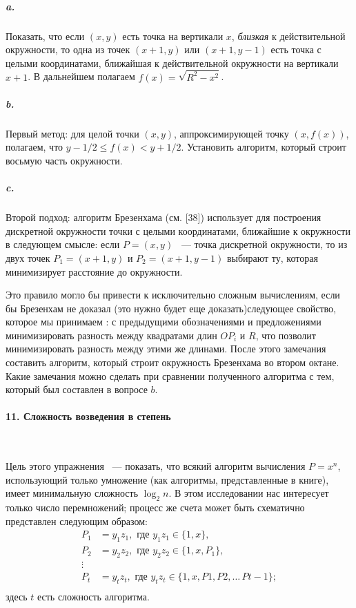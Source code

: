 \documentclass{mai_book}
\begin{document}
\subparagraph { a.} Показать, что если $\left({x,y}\right)$ есть точка на вертикали $x$, \textit{близкая} к действительной окружности, то одна из точек $\left({x+1,y}\right)$ или  $\left({x+1,y-1}\right)$ есть точка с целыми координатами, ближайшая к действительной окружности на вертикали $x+1$. В дальнейшем полагаем $f\left({x}\right)=\sqrt{R^{2}-x^{2}}$.
\newpage
	

\subparagraph { b.} Первый метод: для целой точки $\left({x,y}\right)$, аппроксимирующей точку $\left(x,f(x)\right)$, полагаем, что $y-1/2\leqslant{f\left({x}\right)}<y+1/2$. Установить алгоритм, который строит восьмую часть окружности. 

\subparagraph { c.} Второй подход: алгоритм Брезенхама (см. [38]) использует для построения дискретной окружности точки с целыми координатами, ближайшие к окружности в следующем смысле:  если $P=\left({x,y}\right)$ ~--- точка дискретной окружности, то из двух точек  $P_{1}=\left({x+1,y}\right)$ и  $P_{2}=\left({x+1,y-1}\right)$ выбирают ту, которая минимизирует расстояние до окружности. 

Это правило могло бы привести к исключительно сложным вычислениям, если бы Брезенхам не доказал (это нужно будет еще доказать)следующее свойство, которое мы принимаем : с предыдущими обозначениями и предложениями минимизировать разность между квадратами длин $OP_{i}$ и $R$, что позволит минимизировать разность между этими же длинами. После этого замечания составить алгоритм, который строит окружность Брезенхама во втором октане. Какие замечания можно сделать при сравнении полученного алгоритма с тем, который был составлен в вопросе $b$.

\paragraph { 11. Сложность возведения в степень}\ \newline

Цель этого упражнения ~--- показать, что всякий алгоритм вычисления $P=x^{n}$, использующий только умножение (как алгоритмы, представленные в книге), имеет минимальную сложность $\log_{2}{n}$. В этом исследовании нас интересует только число перемножений; процесс же счета может быть схематично представлен следующим образом:
\begin{equation*}
\begin{split}
P_{1}&=y_{1}z_{1}, \text{ где } y_{1}z_{1} \in{\{1,x\}},\\ 
P_{2}&=y_{2}z_{2}, \text{ где } y_{2}z_{2} \in{\{1,x,P_{1}\}},\\
\vdots\\
P_{t}&=y_{t}z_{t}, \text{ где } y_{t}z_{t} \in{\{1,x,P{1},P{2}, \dots\,P{t-1}\}};\\
\end{split}
\end{equation*}
здесь $t$ есть сложность алгоритма. 
\end{document}
